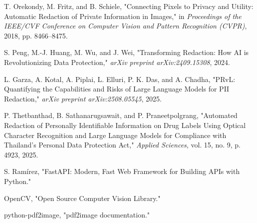 \begin{trivlist}
\item[13.] T. Orekondy, M. Fritz, and B. Schiele, "Connecting Pixels to Privacy and Utility: Automatic Redaction of Private Information in Images," in \textit{Proceedings of the IEEE/CVF Conference on Computer Vision and Pattern Recognition (CVPR)}, 2018, pp. 8466--8475.

\item[14.] S. Peng, M.-J. Huang, M. Wu, and J. Wei, "Transforming Redaction: How AI is Revolutionizing Data Protection," \textit{arXiv preprint arXiv:2409.15308}, 2024.

\item[15.] L. Garza, A. Kotal, A. Piplai, L. Elluri, P. K. Das, and A. Chadha, "PRvL: Quantifying the Capabilities and Risks of Large Language Models for PII Redaction," \textit{arXiv preprint arXiv:2508.05545}, 2025.

\item[16.] P. Thetbanthad, B. Sathanarugsawait, and P. Praneetpolgrang, "Automated Redaction of Personally Identifiable Information on Drug Labels Using Optical Character Recognition and Large Language Models for Compliance with Thailand's Personal Data Protection Act," \textit{Applied Sciences}, vol. 15, no. 9, p. 4923, 2025.

\item[17.] S. Ram{\'i}rez, "FastAPI: Modern, Fast Web Framework for Building APIs with Python."

\item[18.] OpenCV, "Open Source Computer Vision Library."

\item[19.] python-pdf2image, "pdf2image documentation."
\end{trivlist}